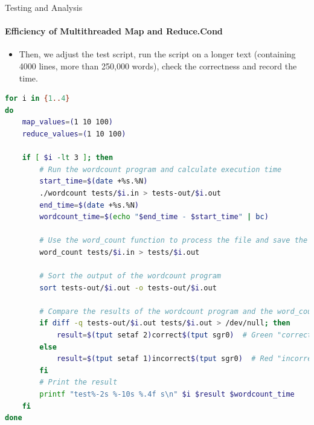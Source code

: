 \documentclass[10pt]{beamer}
\begin{document}
\begin{frame}[fragile]{Testing and Analysis}
    \framesubtitle{Efficiency of Multithreaded Map and Reduce.Cond}
    \begin{itemize}
        \item Then, we adjust the test script, run the script on a longer text (containing 4000 lines, more than 250,000 words), check the correctness and record the time.
    \end{itemize}
    \begin{lstlisting}[language=bash]
for i in {1..4}
do
    map_values=(1 10 100)
    reduce_values=(1 10 100)

    if [ $i -lt 3 ]; then
        # Run the wordcount program and calculate execution time
        start_time=$(date +%s.%N)
        ./wordcount tests/$i.in > tests-out/$i.out
        end_time=$(date +%s.%N)
        wordcount_time=$(echo "$end_time - $start_time" | bc)

        # Use the word_count function to process the file and save the result
        word_count tests/$i.in > tests/$i.out

        # Sort the output of the wordcount program
        sort tests-out/$i.out -o tests-out/$i.out

        # Compare the results of the wordcount program and the word_count function
        if diff -q tests-out/$i.out tests/$i.out > /dev/null; then
            result=$(tput setaf 2)correct$(tput sgr0)  # Green "correct"
        else
            result=$(tput setaf 1)incorrect$(tput sgr0)  # Red "incorrect"
        fi
        # Print the result
        printf "test%-2s %-10s %.4f s\n" $i $result $wordcount_time
    fi
done
        \end{lstlisting}
\end{frame}
\end{document}
